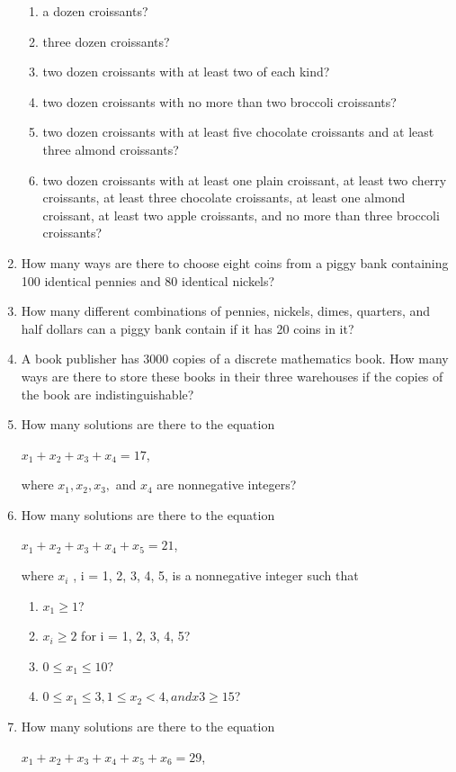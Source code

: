 \documentclass[11pt,a4paper]{book}
\begin{document}
\begin{enumerate}
\begin{enumerate}[label=(\alph*)]
\item a dozen croissants?
\item three dozen croissants?
\item two dozen croissants with at least two of each kind?
\item two dozen croissants with no more than two broccoli croissants?
\item two dozen croissants with at least five chocolate croissants and at least three almond croissants?
\item two dozen croissants with at least one plain croissant, at least two cherry croissants, at least three chocolate croissants, at least one almond croissant, at least two apple croissants, and no more than three broccoli croissants?
\end{enumerate}
\item How many ways are there to choose eight coins from a piggy bank containing 100 identical pennies and 80 identical nickels?
\item How many different combinations of pennies, nickels, dimes, quarters, and half dollars can a piggy bank contain if it has 20 coins in it?
\item A book publisher has 3000 copies of a discrete mathematics book.
How many ways are there to store these books in their three warehouses if the copies of the book are indistinguishable?
\item How many solutions are there to the equation 

$x_1 + x_2 + x_3 + x_4 = 17$,

where $x_1, x_2, x_3,$ and $x_4$ are nonnegative integers?
\item How many solutions are there to the equation 

$x_1 + x_2 + x_3 + x_4 + x_5 = 21$,

where $x_i$ , i = 1, 2, 3, 4, 5, is a nonnegative integer such that
\begin{enumerate}[label=(\alph*)]
\item $x_1 \geq 1$?
\item $x_i \geq 2$ for i = 1, 2, 3, 4, 5?
\item $0 \leq x_1 \leq 10$?
\item $0 \leq x_1 \leq 3, 1 \leq x_2 < 4, and x3 \geq 15$?
\end{enumerate}
\item How many solutions are there to the equation 

$x_1 + x_2 + x_3 + x_4 + x_5 + x_6 = 29$,


\end{enumerate}
\end{document}
